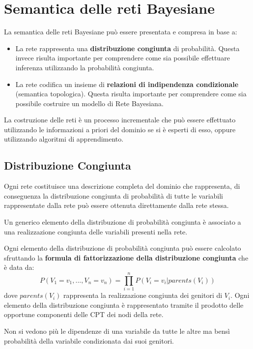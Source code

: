 \section{Semantica delle reti Bayesiane}
La semantica delle reti Bayesiane può essere presentata e compresa in base a:
\begin{itemize}
    \item La rete rappresenta una \textbf{distribuzione congiunta} di probabilità.
          Questa invece risulta importante per comprendere come sia possibile
          effettuare inferenza utilizzando la probabilità congiunta.
    \item La rete codifica un insieme di \textbf{relazioni di indipendenza condizionale}
          (semantica topologica).
          Questa
          risulta importante per comprendere come sia possibile costruire un
          modello di Rete Bayesiana.
\end{itemize}  


La costruzione delle reti è un processo incrementale che può essere effettuato
utilizzando le informazioni a priori del dominio se si è esperti di esso, oppure
utilizzando algoritmi di apprendimento.

\subsection{Distribuzione Congiunta}
Ogni rete costituisce una descrizione completa del dominio che rappresenta, di
conseguenza la distribuzione congiunta di probabilità di tutte le variabili
rappresentate dalla rete può essere ottenuta direttamente dalla rete stessa.

Un generico elemento della distribuzione di probabilità congiunta è associato a
una realizzazione congiunta delle variabili presenti nella rete.

Ogni elemento della distribuzione di probabilità congiunta può essere calcolato
sfruttando la \textbf{formula di fattorizzazione della distribuzione congiunta}
che è data da:
\begin{equation}
    P(V_1 = v_1,...,V_n = v_n) = \prod_{i=1}^{n} P(V_i=v_i|parents(V_i))
\end{equation}
dove $parents(V_i)$ rappresenta la realizzazione congiunta dei genitori di $V_i$.
Ogni elemento della distribuzione congiunta è rappresentato tramite il prodotto
delle opportune componenti delle CPT dei nodi della rete.

\begin{nota}
    Non si vedono più le dipendenze di una variabile da tutte le altre ma bensì
    probabilità della variabile condizionata dai suoi genitori.
\end{nota}

